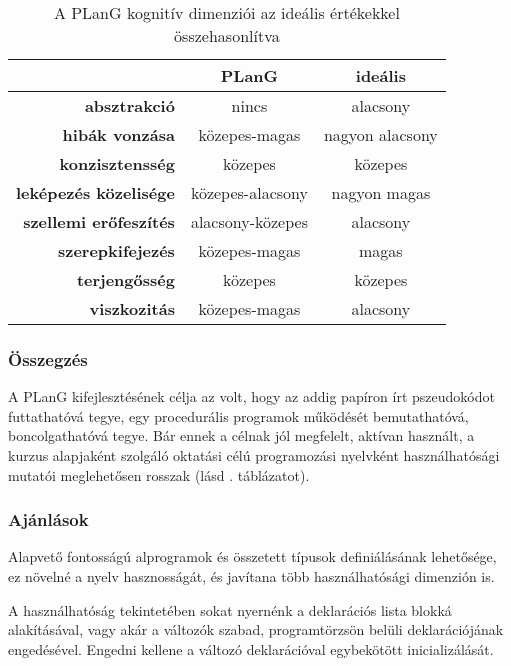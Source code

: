 \begin{table}[tb]
	\centering
	\begin{tabular}{ r c c }
						& \bfseries PLanG	 & \bfseries ideális \\ \hline
		\bfseries absztrakció 		&\cellcolor{red!30}nincs & alacsony \\
		\bfseries hibák vonzása 	&\cellcolor{red!30}közepes-magas & nagyon alacsony \\
		\bfseries konzisztensség 	&\cellcolor{yellow!30}közepes & közepes  \\
		\bfseries leképezés közelisége &\cellcolor{red!30}közepes-alacsony & nagyon magas \\
		\bfseries szellemi erőfeszítés &\cellcolor{green!30}alacsony-közepes & alacsony \\
		\bfseries szerepkifejezés &\cellcolor{green!30}közepes-magas	& magas \\
		\bfseries terjengősség &\cellcolor{yellow!30}közepes	& közepes \\
		\bfseries viszkozitás &\cellcolor{red!30}közepes-magas	& alacsony
	\end{tabular}
	\caption{A PLanG kognitív dimenziói az ideális értékekkel összehasonlítva}
	\label{tab:plangminmut}
\end{table}

\subsubsection{Összegzés}
A PLanG kifejlesztésének célja az volt, hogy az addig papíron írt pszeudokódot futtathatóvá tegye, egy procedurális programok működését bemutathatóvá, boncolgathatóvá tegye\cite{lovei}.
Bár ennek a célnak jól megfelelt, aktívan használt, a kurzus alapjaként szolgáló oktatási célú programozási nyelvként használhatósági mutatói meglehetősen rosszak (lásd . táblázatot).


\subsubsection{Ajánlások}
Alapvető fontosságú alprogramok és összetett típusok definiálásának lehetősége, ez növelné a nyelv hasznosságát, és javítana több használhatósági dimenzión is.

A használhatóság tekintetében sokat nyernénk a deklarációs lista blokká alakításával, vagy akár a változók szabad, programtörzsön belüli deklarációjának engedésével. Engedni kellene a változó deklarációval egybekötött inicializálását.

